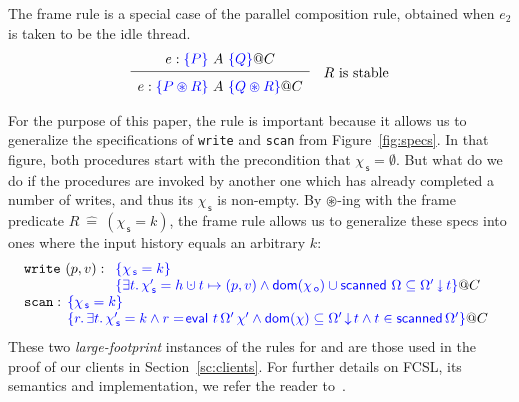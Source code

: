 \documentclass[a4paper,UKenglish]{lipics-v2016}
\newcounter{tags}
\newcommand{\dom}[1]{\mathsf{dom}(#1)}
\newcommand{\specK}[1]{\ensuremath{\textcolor{blue}{#1}}}
\newcommand{\dotcup}{\ensuremath{\mathaccent\cdot\cup}}
\newcommand{\selfsub}{\mathsf{s}}
\newcommand{\othersub}{\mathsf{o}}
\newcommand{\hist}{\chi}
\newcommand{\histS}{\hist_{\, \selfsub}}
\newcommand{\histO}{\hist_{\, \othersub}}
\newcommand{\hempty}{\emptyset}
\newcommand{\hunion}{\mathbin{\dotcup}}
\newcommand{\eqdef}{\mathrel{\:\widehat{=}\:}}
\newcommand{\ldot}{\mathord{.}\,}
\newcommand{\stableorder}{\Omega}
\newcommand{\stableorderP}{\stableorder'}
\newcommand{\histP}{\chi'}
\newcommand{\histSP}{\hist_{\, \selfsub}'}
\newcommand{\tsPre}[1]{\ensuremath{{\textcolor{blue}{#1}}}}
\newcommand{\tsPos}[1]{\ensuremath{\textcolor{blue}{#1}}}
\theoremstyle{definition}
\begin{document}
The frame rule is a special case of the parallel composition rule,
obtained when $e_2$ is taken to be the idle thread.
\[
\hfill \begin{array}{c}
e : \specK{\{P\}}\ A\ \specK{\{Q\}} @ C\\[2pt]
\hline\\[-7pt]
e : \specK{\{P \circledast R\}}\ A\ \specK{\{Q \circledast R\}} @ C 
\end{array}  \quad \mbox{$R$ is stable} \hfill
\]

For the purpose of this paper, the rule is important because it allows
us to generalize the specifications of {\tt write} and {\tt scan} from
Figure~\ref{fig:specs}. In that figure, both procedures start with the
precondition that $\histS = \hempty$. But what do we do if the
procedures are invoked by another one which has already completed a
number of writes, and thus its $\histS$ is non-empty. By
$\circledast$-ing with the frame predicate $R \eqdef (\histS = k)$,
the frame rule allows us to generalize these specs into ones where the
input history equals an arbitrary $k$:
%
\[
\begin{array}{l}
\mathtt{write}\ (p, v) : %
\begin{array}[t]{l}
\tsPre{\{\histS = k\}}\\
\tsPos{\{\exists t\ldot \histS' = h \hunion t \mapsto (p, v) \wedge
    \dom {\histO} \cup \scanned\, \stableorder
       \subseteq \sideal{\stableorderP}{t}\}} @ C %
\end{array}\\[5pt]
%
\mathtt{scan} : 
\!\!\begin{array}[t]{l}
\tsPre{\{\histS = k\}}\\
\tsPos{\{r\ldot \exists t\ldot \histSP = k \wedge
   r =\! \eval\ t\, {\stableorderP}\, {\histP} \wedge
  \dom{\hist} \subseteq \ideal{\stableorderP}{t} \wedge
  t \in \scanned{\stableorderP}\}} @ C %
\end{array}
\end{array}
\]
%
These two {\it large-footprint} instances of the rules for {\jyscan}
and {\jywrite} are those used in the proof of our clients in
Section~\ref{sc:clients}. For further details on FCSL, its semantics
and implementation, we refer the reader to~\cite{NanevskiLSD+ESOP14}.
\end{document}
